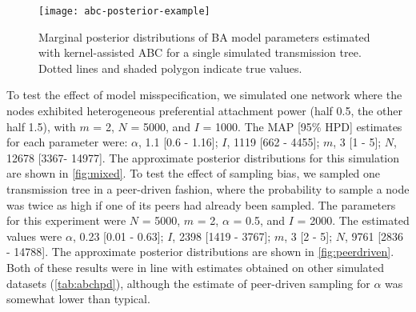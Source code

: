 \begin{figure}[ht]
    \centering
    \texttt{[image: abc-posterior-example]}
  \vspace{6pt}
  \caption{
    Marginal posterior distributions of BA model parameters estimated
    with kernel-assisted ABC for a single simulated transmission tree. Dotted
    lines and shaded polygon indicate true values.
  }
  \label{fig:abcex}
\end{figure}



To test the effect of model misspecification, we simulated one network where
the nodes exhibited heterogeneous preferential attachment power (half 0.5, the
other half 1.5), with $m$ = 2, $N$ = 5000, and $I$ = 1000. The MAP [95\%
HPD] estimates for each parameter were: 
$\alpha$, 
  1.1 
  [0.6 -
   1.16];
$I$,
  1119 
  [662 -
   4455];
$m$,
  3 
  [1 -
   5];
$N$,
  12678 
  [3367-
   14977].
The approximate posterior distributions for this simulation are shown in
\cref{fig:mixed}. To test the effect of sampling bias, we sampled one
transmission tree in a peer-driven fashion, where the probability to sample a
node was twice as high if one of its peers had already been sampled. The
parameters for this experiment were $N$ = 5000, $m$ = 2, $\alpha$ = 0.5, and
$I$ = 2000. The estimated values were
$\alpha$, 
  0.23 
  [0.01 -
   0.63];
$I$,
  2398 
  [1419 -
   3767];
$m$,
  3 
  [2 -
   5];
$N$,
  9761 
  [2836 -
   14788].
The approximate posterior distributions are shown in \cref{fig:peerdriven}. Both
of these results were in line with estimates obtained on other simulated
datasets (\cref{tab:abchpd}), although the estimate of peer-driven sampling for
$\alpha$ was somewhat lower than typical.

